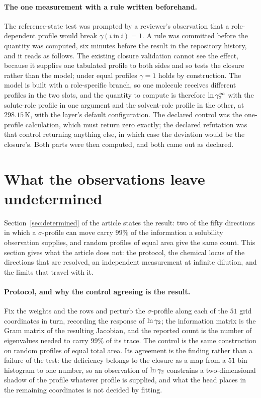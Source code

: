 \paragraph{The one measurement with a rule written beforehand.}
The reference-state test was prompted by a reviewer's observation that a role-dependent profile
would break $\gamma(i\ \mathrm{in}\ i)=1$. A rule was committed before the quantity was computed,
six minutes before the result in the repository history, and it reads as follows. The existing
closure validation cannot see the effect, because it supplies one tabulated profile to both sides
and so tests the closure rather than the model; under equal profiles $\gamma=1$ holds by
construction. The model is built with a role-specific branch, so one molecule receives different
profiles in the two slots, and the quantity to compute is therefore $\ln\gamma_2^\infty$ with the solute-role
profile in one argument and the solvent-role profile in the other, at $298.15$\,K, with the layer's
default configuration. The declared control was the one-profile calculation, which must return zero
exactly; the declared refutation was that control returning anything else, in which case the
deviation would be the closure's. Both parts were then computed, and both came out as declared.

\section{What the observations leave undetermined}
\label{si:unresolved}

Section~\ref{sec:determined} of the article states the result: two of the fifty directions in which
a $\sigma$-profile can move carry $99\%$ of the information a solubility observation supplies, and
random profiles of equal area give the same count. This section gives what the article does not:
the protocol, the chemical locus of the directions that are resolved, an independent measurement at
infinite dilution, and the limits that travel with it.

\paragraph{Protocol, and why the control agreeing is the result.}
Fix the weights and the rows and perturb the $\sigma$-profile along each of the $51$ grid
coordinates in turn, recording the response of $\ln\gamma_2$; the information matrix is the Gram matrix of
the resulting Jacobian, and the reported count is the number of eigenvalues needed to carry $99\%$
of its trace. The control is the same construction on random profiles of equal total area. Its
agreement is the finding rather than a failure of the test: the deficiency belongs to the closure
as a map from a $51$-bin histogram to one number, so an observation of $\ln\gamma_2$ constrains a
two-dimensional shadow of the profile whatever profile is supplied, and what the head places in the
remaining coordinates is not decided by fitting.

